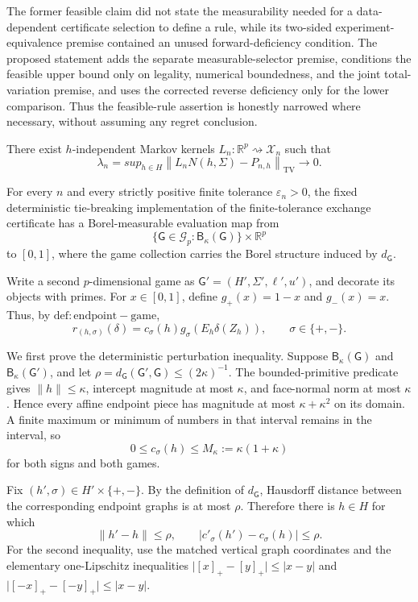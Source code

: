 The former feasible claim did not state the measurability needed for a data-dependent certificate selection to define a rule, while its two-sided experiment-equivalence premise contained an unused forward-deficiency condition. The proposed statement adds the separate measurable-selector premise, conditions the feasible upper bound only on legality, numerical boundedness, and the joint total-variation premise, and uses the corrected reverse deficiency only for the lower comparison. Thus the feasible-rule assertion is honestly narrowed where necessary, without assuming any regret conclusion.

There exist \(h\)-independent Markov kernels \(L_n:\mathbb R^p\rightsquigarrow\mathcal X_n\) such that
\[
 \lambda_n=sup_{h\in H}
 \left\lVert L_nN(h,\Sigma)-P_{n,h}\right\rVert_{\mathrm{TV}}
 \longrightarrow0.
\]

For every \(n\) and every strictly positive finite tolerance \(\varepsilon_n>0\), the fixed deterministic tie-breaking implementation of the finite-tolerance exchange certificate has a Borel-measurable evaluation map from
\[
 \{\mathsf G\in\mathcal G_p:\mathsf B_{\kappa}(\mathsf G)\}
 \times\mathbb R^p
\]
to \([0,1]\), where the game collection carries the Borel structure induced by \(d_{\mathsf G}\).

Write a second \(p\)-dimensional game as \(\mathsf G'=(H',\Sigma',\ell',u')\), and decorate its objects with primes. For \(x\in[0,1]\), define \(g_+(x)=1-x\) and \(g_-(x)=x\). Thus, by \(\mathrm{def:endpoint-game}\),
\[
 r_{(h,\sigma)}(\delta)=c_{\sigma}(h)
 g_{\sigma}\!\left(E_h\delta(Z_h)\right),
 \qquad \sigma\in\{+,-\}. \tag{1}
\]

We first prove the deterministic perturbation inequality. Suppose \(\mathsf B_{\kappa}(\mathsf G)\) and \(\mathsf B_{\kappa}(\mathsf G')\), and let \(\rho=d_{\mathsf G}(\mathsf G',\mathsf G)\leq(2\kappa)^{-1}\). The bounded-primitive predicate gives \(\lVert h\rVert\leq\kappa\), intercept magnitude at most \(\kappa\), and face-normal norm at most \(\kappa\). Hence every affine endpoint piece has magnitude at most \(\kappa+\kappa^2\) on its domain. A finite maximum or minimum of numbers in that interval remains in the interval, so
\[
 0\leq c_{\sigma}(h)\leq M_{\kappa}:=\kappa(1+\kappa) \tag{2}
\]
for both signs and both games.

Fix \((h',\sigma)\in H'\times\{+,-\}\). By the definition of \(d_{\mathsf G}\), Hausdorff distance between the corresponding endpoint graphs is at most \(\rho\). Therefore there is \(h\in H\) for which
\[
 \lVert h'-h\rVert\leq\rho,
 \qquad
 \lvert c'_{\sigma}(h')-c_{\sigma}(h)\rvert\leq\rho. \tag{3}
\]
For the second inequality, use the matched vertical graph coordinates and the elementary one-Lipschitz inequalities \(\lvert[x]_+-[y]_+\rvert\leq\lvert x-y\rvert\) and \(\lvert[-x]_+-[-y]_+\rvert\leq\lvert x-y\rvert\).

